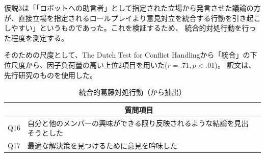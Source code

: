 \documentclass[11pt, a4paper]{jreport} %
\begin{document}

仮説3は「「ロボットへの助言者」として指定された立場から発言させた議論の方が、直接立場を指定されるロールプレイより意見対立を統合する行動を引き起こしやすい」というものであった。これを検証するため、
統合的対処行動を行った程度を測定する。

そのための尺度として、The Dutch Test for Conflict Handling\cite{dutch}から「統合」の下位尺度から、因子負荷量の高い上位2項目を用いた($r=.71, p<.01$)。
訳文は、先行研究\cite{村山綾20141203}のものを使用した。
\begin{table}[H]
\caption{統合的葛藤対処行動（\cite{dutch}から抽出）}
\centering
\label{tab:conflict_deal}
\begin{tabular}{@{}lll@{}}
\toprule
\multicolumn{1}{c}{} & \multicolumn{1}{c}{質問項目}             \\ \midrule
             Q16      & 自分と他のメンバーの興味ができる限り反映されるような結論を見出そうとした \\
                 Q17    & 最適な解決策を見つけるために意見を吟味した                 \\ \bottomrule
\end{tabular}
\end{table}
\end{document}
